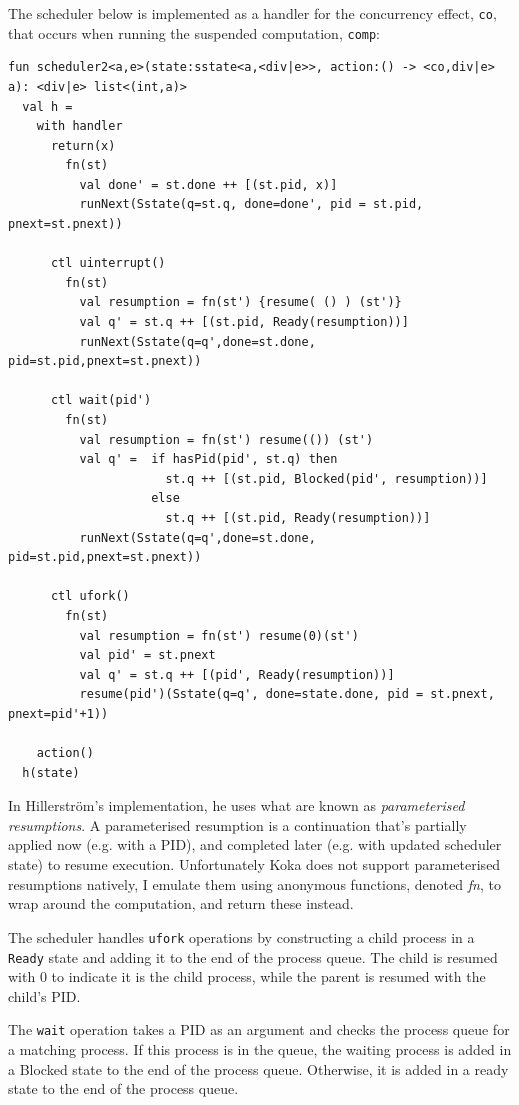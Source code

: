 \documentclass[logo,bsc,singlespacing,parskip]{infthesis}
\begin{document}
The scheduler below is implemented as a handler for the concurrency effect, \lstinline{co}, that occurs when running the suspended computation, \lstinline{comp}: 


\begin{lstlisting}
fun scheduler2<a,e>(state:sstate<a,<div|e>>, action:() -> <co,div|e> a): <div|e> list<(int,a)>
  val h = 
    with handler
      return(x)
        fn(st)
          val done' = st.done ++ [(st.pid, x)]
          runNext(Sstate(q=st.q, done=done', pid = st.pid, pnext=st.pnext))
        
      ctl uinterrupt()
        fn(st)
          val resumption = fn(st') {resume( () ) (st')}
          val q' = st.q ++ [(st.pid, Ready(resumption))]
          runNext(Sstate(q=q',done=st.done, pid=st.pid,pnext=st.pnext))
        
      ctl wait(pid')
        fn(st)
          val resumption = fn(st') resume(()) (st')
          val q' =  if hasPid(pid', st.q) then 
                      st.q ++ [(st.pid, Blocked(pid', resumption))] 
                    else 
                      st.q ++ [(st.pid, Ready(resumption))]
          runNext(Sstate(q=q',done=st.done, pid=st.pid,pnext=st.pnext))
        
      ctl ufork()
        fn(st)
          val resumption = fn(st') resume(0)(st')
          val pid' = st.pnext
          val q' = st.q ++ [(pid', Ready(resumption))]
          resume(pid')(Sstate(q=q', done=state.done, pid = st.pnext, pnext=pid'+1))
      
    action()
  h(state)
\end{lstlisting}    
In Hillerström's implementation, he uses what are known as \textit{parameterised resumptions}. A parameterised resumption is a continuation that’s partially applied now (e.g. with a PID), and completed later (e.g. with updated scheduler state) to resume execution. Unfortunately Koka does not support parameterised resumptions natively, I emulate them using anonymous functions, denoted \textit{fn}, to wrap around the computation, and return these instead.  

The scheduler handles \lstinline{ufork} operations by constructing a child process in a \lstinline{Ready} state and adding it to the end of the process queue. The child is resumed with 0 to indicate it is the child process, while the parent is resumed with the child's PID.

The \lstinline{wait} operation takes a PID as an argument and checks the process queue for a matching process. If this process is in the queue, the waiting process is added in a Blocked state to the end of the process queue. Otherwise, it is added in a ready state to the end of the process queue.
\end{document}
